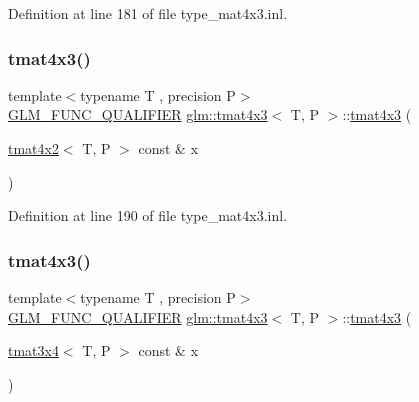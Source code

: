 Definition at line 181 of file type\+\_\+mat4x3.\+inl.

\mbox{\label{structglm_1_1tmat4x3_adfbc5c5490e4bd2606d1c20fd76cd3b2}} 
\subsubsection{\texorpdfstring{tmat4x3()}{tmat4x3()}\hspace{0.1cm}{\footnotesize\ttfamily [17/22]}}
{\footnotesize\ttfamily template$<$typename T , precision P$>$ \\
\mbox{\hyperlink{setup_8hpp_a33fdea6f91c5f834105f7415e2a64407}{G\+L\+M\+\_\+\+F\+U\+N\+C\+\_\+\+Q\+U\+A\+L\+I\+F\+I\+ER}} \mbox{\hyperlink{structglm_1_1tmat4x3}{glm\+::tmat4x3}}$<$ T, P $>$\+::\mbox{\hyperlink{structglm_1_1tmat4x3}{tmat4x3}} (\begin{DoxyParamCaption}\item[{\mbox{\hyperlink{structglm_1_1tmat4x2}{tmat4x2}}$<$ T, P $>$ const \&}]{x }\end{DoxyParamCaption})}



Definition at line 190 of file type\+\_\+mat4x3.\+inl.

\mbox{\label{structglm_1_1tmat4x3_a61edf2edf20cb9f6b6a977aa041d5f19}} 
\subsubsection{\texorpdfstring{tmat4x3()}{tmat4x3()}\hspace{0.1cm}{\footnotesize\ttfamily [18/22]}}
{\footnotesize\ttfamily template$<$typename T , precision P$>$ \\
\mbox{\hyperlink{setup_8hpp_a33fdea6f91c5f834105f7415e2a64407}{G\+L\+M\+\_\+\+F\+U\+N\+C\+\_\+\+Q\+U\+A\+L\+I\+F\+I\+ER}} \mbox{\hyperlink{structglm_1_1tmat4x3}{glm\+::tmat4x3}}$<$ T, P $>$\+::\mbox{\hyperlink{structglm_1_1tmat4x3}{tmat4x3}} (\begin{DoxyParamCaption}\item[{\mbox{\hyperlink{structglm_1_1tmat3x4}{tmat3x4}}$<$ T, P $>$ const \&}]{x }\end{DoxyParamCaption})}



